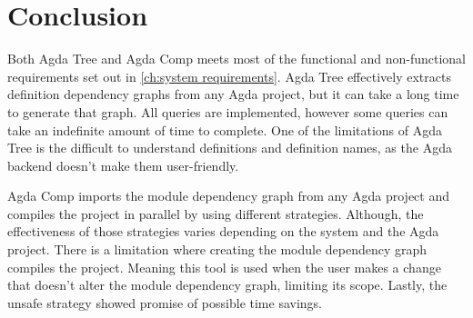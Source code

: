 \section{Conclusion}

Both Agda Tree and Agda Comp meets most of the functional and non-functional
requirements set out in \cref{ch:system requirements}. Agda Tree effectively
extracts definition dependency graphs from any Agda project, but it can take a
long time to generate that graph. All queries are implemented, however some
queries can take an indefinite amount of time to complete. One of the
limitations of Agda Tree is the difficult to understand definitions and
definition names, as the Agda backend doesn't make them user-friendly.

Agda Comp imports the module dependency graph from any Agda project and
compiles the project in parallel by using different strategies. Although, the
effectiveness of those strategies varies depending on the system and the Agda
project. There is a limitation where creating the module dependency graph
compiles the project. Meaning this tool is used when the user makes a change
that doesn't alter the module dependency graph, limiting its scope. Lastly, the
unsafe strategy showed promise of possible time savings.




